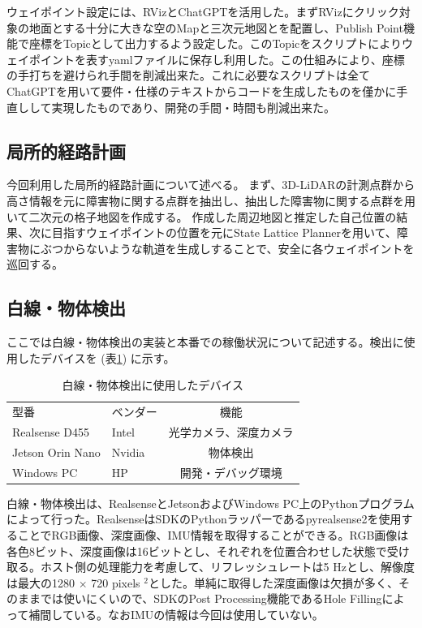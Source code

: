 \documentclass[platex,dvipdfmx]{rbproceedings}
\begin{document}
ウェイポイント設定には、RVizとChatGPTを活用した。まずRVizにクリック対象の地面とする十分に大きな空のMapと三次元地図とを配置し、Publish Point機能で座標をTopicとして出力するよう設定した。このTopicをスクリプトによりウェイポイントを表すyamlファイルに保存し利用した。この仕組みにより、座標の手打ちを避けられ手間を削減出来た。これに必要なスクリプトは全てChatGPTを用いて要件・仕様のテキストからコードを生成したものを僅かに手直しして実現したものであり、開発の手間・時間も削減出来た。

\subsection{局所的経路計画}
今回利用した局所的経路計画について述べる。
まず、3D-LiDARの計測点群から高さ情報を元に障害物に関する点群を抽出し、抽出した障害物に関する点群を用いて二次元の格子地図を作成する。
作成した周辺地図と推定した自己位置の結果、次に目指すウェイポイントの位置を元にState Lattice Planner\cite{state_lattice}を用いて、障害物にぶつからないような軌道を生成しすることで、安全に各ウェイポイントを巡回する。

\subsection{白線・物体検出}
ここでは白線・物体検出の実装と本番での稼働状況について記述する。検出に使用したデバイスを (表\ref{tab:white_line_devices}) に示す。

\begin{table}
\centering
\caption{白線・物体検出に使用したデバイス}
\label{tab:white_line_devices}
\begin{tabular}{llc}
\hline
型番& ベンダー& 機能\\
 Realsense D455& Intel& 光学カメラ、深度カメラ\\
 Jetson Orin Nano& Nvidia& 物体検出\\
Windows PC& HP& 開発・デバッグ環境\\
\hline
\end{tabular}
\end{table}


白線・物体検出は、RealsenseとJetsonおよびWindows PC上のPythonプログラムによって行った。RealsenseはSDKのPythonラッパーであるpyrealsense2を使用することでRGB画像、深度画像、IMU情報を取得することができる。RGB画像は各色8ビット、深度画像は16ビットとし、それぞれを位置合わせした状態で受け取る。ホスト側の処理能力を考慮して、リフレッシュレートは5 Hzとし、解像度は最大の1280 $\times$ 720 pixels $^2$とした。単純に取得した深度画像は欠損が多く、そのままでは使いにくいので、SDKのPost Processing機能であるHole Fillingによって補間している。なおIMUの情報は今回は使用していない。
\end{document}
